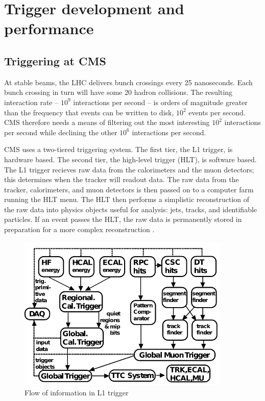 \setlength\abovedisplayskip{0.4pt}
\setlength\belowdisplayskip{0.4pt}

\chapter{Trigger development and performance}

\section{Triggering at CMS}

At stable beams, the LHC delivers bunch crossings every 25 nanoseconds. Each bunch crossing in turn will have some 20 hadron collisions. The resulting interaction rate -- $10^9$ interactions per second -- is orders of magnitude greater than the frequency that events can be written to disk, $10^2$ events per second. CMS therefore needs a means of filtering out the most interesting $10^2$ interactions per second while declining the other $10^6$ interactions per second. 

CMS uses a two-tiered triggering system. The first tier, the L1 trigger, is hardware based. The second tier, the high-level trigger (HLT), is software based. The L1 trigger recieves raw data from the calorimeters and the muon detectors; this determines when the tracker will readout data. The raw data from the tracker, calorimeters, and muon detectors is then passed on to a computer farm running the HLT menu. The HLT then performs a simplistic reconstruction of the raw data into physics objects useful for analysis: jets, tracks, and identifiable particles. If an event passes the HLT, the raw data is permanently stored in preparation for a more complex reconstruction \cite{Dasu:2000ge}\cite{Sphicas:2002gg}. 

\begin{figure}[h!]
\begin{centering}
\includegraphics[width=4in]{Chapter5/importfigs/l1_trigger_flow.png}
\par\end{centering}
\caption{Flow of information in L1 trigger \label{fig:l1TriggerFlow}}
\end{figure}

